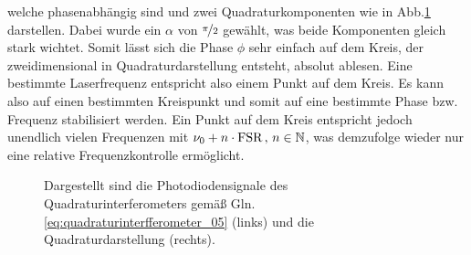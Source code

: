 welche phasenabhängig sind und zwei Quadraturkomponenten wie in
Abb.\ref{fig:quadratursignale} darstellen. Dabei wurde ein $\alpha$ von
$\nicefrac{\pi}{2}$ gewählt, was beide Komponenten gleich stark wichtet. Somit
lässt sich die Phase $\phi$ sehr einfach auf dem Kreis, der zweidimensional in
Quadraturdarstellung entsteht, absolut ablesen.
Eine bestimmte Laserfrequenz entspricht also einem Punkt auf dem Kreis. Es kann also
auf einen bestimmten Kreispunkt und somit auf eine bestimmte Phase bzw. Frequenz
stabilisiert werden. Ein Punkt auf dem Kreis entspricht jedoch unendlich vielen
Frequenzen mit $\nu_0+n\cdot\text{FSR}\,,\,n\in\mathbb{N}$, was demzufolge wieder nur
eine relative Frequenzkontrolle ermöglicht.
\begin{figure}[h]
	\centering
	\footnotesize
	
	\caption[Quadratursignale]{Dargestellt sind die
	Photodiodensignale des Quadraturinterferometers
	gemäß Gln. \eqref{eq:quadraturinterfferometer_05}
	(links) und die Quadraturdarstellung (rechts).}\label{fig:quadratursignale}
\end{figure}

